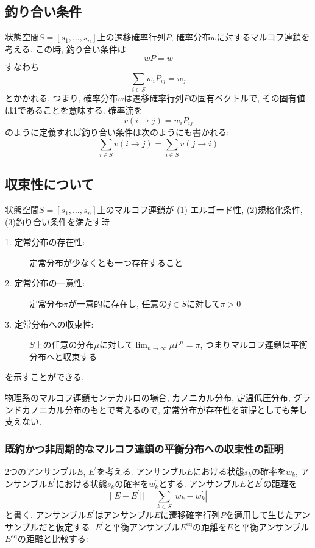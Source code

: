 \subsection{釣り合い条件}
状態空間$S = [s_{1}, \ldots, s_{n}]$上の遷移確率行列$P$, 確率分布$w$に対するマルコフ連鎖を考える.
この時, 釣り合い条件は
\begin{equation}
    w P = w
\end{equation}
すなわち
\begin{equation}
    \sum_{i \in S} w_{i} P_{ij} = w_{j}
\end{equation}
とかかれる.
つまり, 確率分布$w$は遷移確率行列$P$の固有ベクトルで, その固有値は1であることを意味する.
確率流を
\begin{equation}
    v(i \to j) = w_{i} P_{ij}
\end{equation}
のように定義すれば釣り合い条件は次のようにも書かれる:
\begin{equation}
    \sum_{i \in S} v(i \to j) = \sum_{i \in S} v(j \to i)
\end{equation}



\subsection{収束性について}
状態空間$S = [s_{1}, \ldots, s_{n}]$上のマルコフ連鎖が
(1) エルゴード性, (2)規格化条件, (3)釣り合い条件を満たす時

\begin{description}
    \item[1. 定常分布の存在性:] 定常分布が少なくとも一つ存在すること
    \item[2. 定常分布の一意性:] 定常分布$\pi$が一意的に存在し, 任意の$j \in S$に対して$\pi > 0$
    \item[3. 定常分布への収束性:] $S$上の任意の分布$\mu$に対して$\lim_{n\to\infty} \mu P^{n} = \pi$, つまりマルコフ連鎖は平衡分布へと収束する
\end{description}
を示すことができる.

物理系のマルコフ連鎖モンテカルロの場合, カノニカル分布, 定温低圧分布, グランドカノニカル分布のもとで考えるので, 定常分布が存在性を前提としても差し支えない.

\subsubsection{既約かつ非周期的なマルコフ連鎖の平衡分布への収束性の証明}

2つのアンサンブル$E$, $E^{\prime}$を考える.
アンサンブル$E$における状態$s_{k}$の確率を$w_{k}$, アンサンブル$E^{\prime}$における状態$s_{k}$の確率を$w_{k}^{\prime}$とする.
アンサンブル$E$と$E^{\prime}$の距離を
\begin{equation}
    || E - E^{\prime} || = \sum_{k \in S} | w_{k} - w_{k}^{\prime} |
\end{equation}
と書く.
アンサンブル$E^{\prime}$はアンサンブル$E$に遷移確率行列$P$を適用して生じたアンサンブルだと仮定する.
$E^{\prime}$と平衡アンサンブル$E^{\mathrm{eq}}$の距離を$E$と平衡アンサンブル$E^{\mathrm{eq}}$の距離と比較する:

